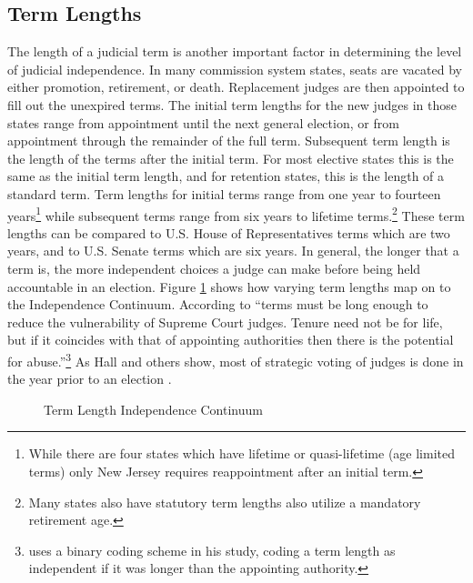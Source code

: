 \documentclass[12pt]{article}
\begin{document}
\subsection*{Term Lengths}
The length of a judicial term is another important factor in determining the level of judicial independence.  In many commission system states, seats are vacated by either promotion, retirement, or death. Replacement judges are then appointed to fill out the unexpired terms. The initial term lengths for the new judges in those states range from appointment until the next general election, or from appointment through the remainder of the full term. Subsequent term length is the length of the terms after the initial term. For most elective states this is the same as the initial term length, and for retention states, this is the length of a standard term. Term lengths for initial terms range from one year to fourteen years\footnote{While there are four states which have lifetime or quasi-lifetime (age limited terms) only New Jersey requires reappointment after an initial term.} while subsequent terms range from six years to lifetime terms.\footnote{Many states also have statutory term lengths also utilize a mandatory retirement age.}  These term lengths can be compared to U.S. House of Representatives terms which are two years, and  to U.S. Senate terms which are six years.  In general, the longer that a term is, the more independent choices a judge can make before being held accountable in an election.  Figure \ref{termcontinuum} shows how varying term lengths map on to the Independence Continuum.  According to \citet[31]{Rios2006} ``terms must be long enough to reduce the vulnerability of Supreme Court judges.  Tenure need not be for life, but if it coincides with that of appointing authorities then there is the potential for abuse.''\footnote{\citet{Rios2006} uses a binary coding scheme in his study, coding a term length as independent if it was longer than the appointing authority.}  As Hall and others show, most of strategic voting of judges is done in the year prior to an election \citep{Hall1987b,Hall1985,Brace2008,Canes-Wrone2012}.  

\begin{figure}[tbh]\centering\caption{Term Length Independence Continuum}\label{termcontinuum}
\end{figure}
\end{document}
